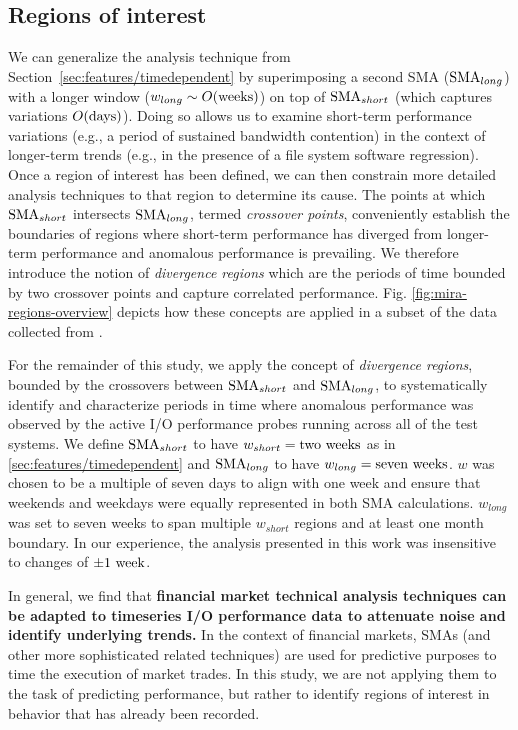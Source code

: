 \subsection{Regions of interest} \label{sec:features/partitioning}

We can generalize the analysis technique from
Section~\ref{sec:features/timedependent} 
by superimposing a second SMA ($\textup{SMA}_{long}$) with a longer window (${w_{long} \sim O(\textup{weeks})}$) on top of $\textup{SMA}_{short}$ (which captures variations ${O(\textup{days})}$).
Doing so allows us to examine short-term performance variations (e.g., a
period of sustained bandwidth contention) in the context of longer-term
trends (e.g., in the presence of a file system software regression).  Once a
region of interest has been defined, we can then constrain more detailed
analysis techniques to that region to determine its cause.
The points at which $\textup{SMA}_{short}$ intersects $\textup{SMA}_{long}$, termed \emph{crossover points}, conveniently establish the boundaries of regions where short-term performance has diverged from longer-term performance and anomalous performance is prevailing.
We therefore introduce the notion of \emph{divergence regions} which are the periods of time bounded by two crossover points and capture correlated performance.
Fig. \ref{fig:mira-regions-overview} depicts how these concepts are applied in a subset of the data collected from \mira.

For the remainder of this study, we apply the concept of \emph{divergence regions}, bounded by the crossovers between $\textup{SMA}_{short}$ and $\textup{SMA}_{long}$, to systematically identify and characterize periods in time where anomalous performance was observed by the active I/O performance probes running across all of the test systems.
We define $\textup{SMA}_{short}$ to have ${w_{short} = \textup{two weeks}}$ as in \ref{sec:features/timedependent} and $\textup{SMA}_{long}$ to have ${w_{long} = \textup{seven weeks}}$.
$w$ was chosen to be a multiple of seven days to align with one
week and ensure that weekends and weekdays were equally represented in both SMA
calculations. $w_{long}$ was set to seven weeks to span multiple $w_{short}$
regions and at least one month boundary.  In our experience, the analysis
presented in this work was insensitive to changes of $\pm 1 \textup{ week}$.

In general, we find that \textbf{financial market technical
analysis techniques can be adapted to
timeseries I/O performance data to attenuate noise and identify underlying trends.}
In the context of financial markets, SMAs (and other more
sophisticated related techniques) are used for predictive purposes to time
the execution of market trades.  In this study, we are not applying them to
the task of predicting performance, but rather to identify regions of
interest in behavior that has already been recorded.

